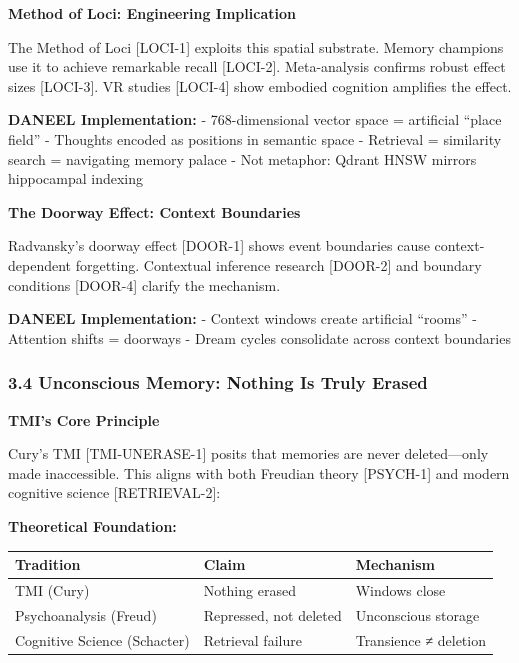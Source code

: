 \documentclass[
  11pt,
]{article}
\newcounter{none} %
\begin{document}
\textbf{Method of Loci: Engineering Implication}

The Method of Loci {[}LOCI-1{]} exploits this spatial substrate. Memory
champions use it to achieve remarkable recall {[}LOCI-2{]}.
Meta-analysis confirms robust effect sizes {[}LOCI-3{]}. VR studies
{[}LOCI-4{]} show embodied cognition amplifies the effect.

\textbf{DANEEL Implementation:} - 768-dimensional vector space =
artificial ``place field'' - Thoughts encoded as positions in semantic
space - Retrieval = similarity search = navigating memory palace - Not
metaphor: Qdrant HNSW mirrors hippocampal indexing

\textbf{The Doorway Effect: Context Boundaries}

Radvansky's doorway effect {[}DOOR-1{]} shows event boundaries cause
context-dependent forgetting. Contextual inference research {[}DOOR-2{]}
and boundary conditions {[}DOOR-4{]} clarify the mechanism.

\textbf{DANEEL Implementation:} - Context windows create artificial
``rooms'' - Attention shifts = doorways - Dream cycles consolidate
across context boundaries

\subsubsection{3.4 Unconscious Memory: Nothing Is Truly
Erased}\label{unconscious-memory-nothing-is-truly-erased}

\textbf{TMI's Core Principle}

Cury's TMI {[}TMI-UNERASE-1{]} posits that memories are never
deleted---only made inaccessible. This aligns with both Freudian theory
{[}PSYCH-1{]} and modern cognitive science {[}RETRIEVAL-2{]}:

\textbf{Theoretical Foundation:}

{\def\LTcaptype{none} %
\begin{longtable}[]{@{}
  >{\raggedright\arraybackslash}p{}
  >{\raggedright\arraybackslash}p{}
  >{\raggedright\arraybackslash}p{}@{}}
\toprule\noalign{}
\begin{minipage}[b]{\linewidth}\raggedright
Tradition
\end{minipage} & \begin{minipage}[b]{\linewidth}\raggedright
Claim
\end{minipage} & \begin{minipage}[b]{\linewidth}\raggedright
Mechanism
\end{minipage} \\
\midrule\noalign{}
\endhead
\bottomrule\noalign{}
\endlastfoot
TMI (Cury) & Nothing erased & Windows close \\
Psychoanalysis (Freud) & Repressed, not deleted & Unconscious storage \\
Cognitive Science (Schacter) & Retrieval failure & Transience ≠
deletion \\
\end{longtable}
}
\end{document}
